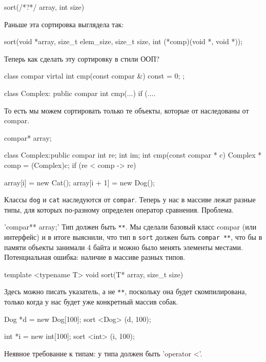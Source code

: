 \begin{cppcode}
sort(/*?*/ array, int size)
\end{cppcode}
Раньше эта сортировка выглядела так:
\begin{cppcode}
sort(void *array, size_t elem_size, size_t size, int (*comp)(void *, void *));
\end{cppcode}

Теперь как сделать эту сортировку в стили ООП?

\begin{cppcode}
class compar{
    virtal int cmp(const compar &) const = 0;
};

class Complex: public compar{
    int cmp(...) {
        if (....
    }
}
\end{cppcode}

То есть мы можем сортировать только те объекты, которые от наследованы от compar.

\begin{cppcode}
compar* array;

class Complex:public compar{
    int re;
    int im;
    int cmp(const compar * c) {
        Complex * comp = (Complex)c;
        if (re < comp -> re)
    }
}

array[i] = new Cat();
array[i + 1] = new Dog();
\end{cppcode}

Классы \verb'dog' и \verb'cat' наследуются от \verb'compar'.
Теперь у нас в массиве лежат разные типы, для которых по-разному определен оператор сравнения.
Проблема.

\cpp'compar** array;'
Тип должен быть \verb'**'.
Мы сделали базовый класс compar (или интерфейс) и в итоге выяснили, что тип в \verb'sort' должен быть \verb'compar **', что бы в памяти объекты занимали 4 байта и 
можно было менять элементы местами.
Потенциальная ошибка: наличие в массиве разных типов. 

\begin{cppcode}
template <typename T>
void sort(T* array, size_t size) {
}
\end{cppcode}
Здесь можно писать указатель, а не \verb'**', поскольку она будет скомпилирована, только когда у нас будет уже конкретный массив собак.

\begin{cppcode}
Dog *d = new Dog[100];
sort <Dog> (d, 100);

int *i = new int[100];
sort <int> (i, 100);
\end{cppcode}

Неявное требование к типам: у типа должен быть \cpp'operator <'.

